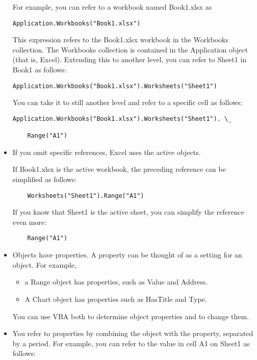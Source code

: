 \documentclass[
]{article}
\theoremstyle{definition}
\theoremstyle{definition}
\theoremstyle{definition}
\theoremstyle{definition}
\theoremstyle{remark}
\begin{document}
\begin{itemize}
  For example, you can refer to a workbook named Book1.xlsx as

\begin{verbatim}
Application.Workbooks("Book1.xlsx")
\end{verbatim}

  This expression refers to the Book1.xlsx workbook in the Workbooks
  collection. The Workbooks collection is contained in the Application
  object (that is, Excel). Extending this to another level, you can
  refer to Sheet1 in Book1 as follows:

\begin{verbatim}
Application.Workbooks("Book1.xlsx").Worksheets("Sheet1")
\end{verbatim}

  You can take it to still another level and refer to a specific cell
  as follows:

\begin{verbatim}
Application.Workbooks("Book1.xlsx").Worksheets("Sheet1"). \_

    Range("A1")
\end{verbatim}
\item
  If you omit specific references, Excel uses the active objects.

  If Book1.xlsx is the active workbook, the preceding reference can be
  simplified as follows:

\begin{verbatim}
    Worksheets("Sheet1").Range("A1")
\end{verbatim}

  If you know that Sheet1 is the active sheet, you can simplify the
  reference even more:

\begin{verbatim}
    Range("A1")
\end{verbatim}
\item
  Objects have properties. A property can be thought of as a setting
  for an object. For example,

  \begin{itemize}
  \item
    a Range object has properties, such as Value and Address.
  \item
    A Chart object has properties such as HasTitle and Type.
  \end{itemize}

  You can use VBA both to determine object properties and to change
  them.
\item
  You refer to properties by combining the object with the property,
  separated by a period. For example, you can refer to the value in
  cell A1 on Sheet1 as follows:


\end{itemize}
\end{document}
